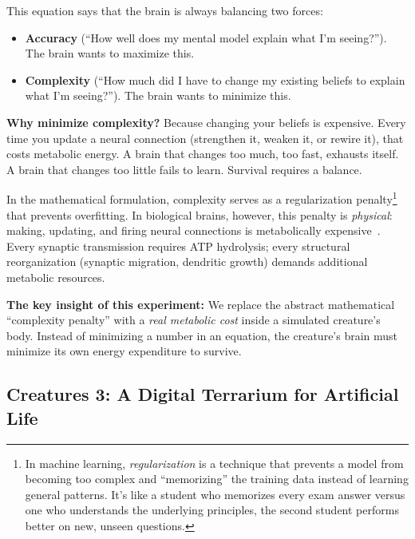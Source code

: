 \documentclass[12pt, a4paper]{article}
\begin{document}
\begin{plainbox}
This equation says that the brain is always balancing two forces:

\begin{itemize}[nosep, leftmargin=1.2em]
  \item \textbf{Accuracy} (``How well does my mental model explain what I'm seeing?''). The brain wants to maximize this.
  \item \textbf{Complexity} (``How much did I have to change my existing beliefs to explain what I'm seeing?''). The brain wants to minimize this.
\end{itemize}

\textbf{Why minimize complexity?} Because changing your beliefs is expensive. Every time you update a neural connection (strengthen it, weaken it, or rewire it), that costs metabolic energy. A brain that changes too much, too fast, exhausts itself. A brain that changes too little fails to learn. Survival requires a balance.
\end{plainbox}

In the mathematical formulation, complexity serves as a regularization penalty\footnote{In machine learning, \emph{regularization} is a technique that prevents a model from becoming too complex and ``memorizing'' the training data instead of learning general patterns. It's like a student who memorizes every exam answer versus one who understands the underlying principles, the second student performs better on new, unseen questions.} that prevents overfitting. In biological brains, however, this penalty is \emph{physical}: making, updating, and firing neural connections is metabolically expensive~\cite{attwell2001energy}. Every synaptic transmission requires ATP hydrolysis; every structural reorganization (synaptic migration, dendritic growth) demands additional metabolic resources.

\textbf{The key insight of this experiment:} We replace the abstract mathematical ``complexity penalty'' with a \emph{real metabolic cost} inside a simulated creature's body. Instead of minimizing a number in an equation, the creature's brain must minimize its own energy expenditure to survive.

\subsection{Creatures 3: A Digital Terrarium for Artificial Life}
\end{document}
